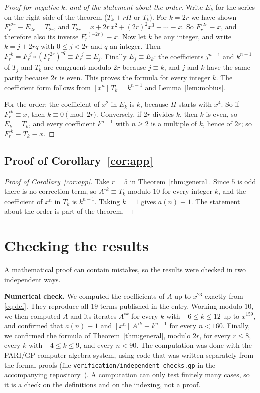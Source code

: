 \documentclass[11pt,a4paper]{article}
\theoremstyle{definition}
\theoremstyle{remark}
\newcommand{\coeff}[2]{[x^{#1}]\,#2}
\newcommand{\para}[1]{\par\medskip\noindent\textbf{#1}\enspace}
\begin{document}
\begin{proof}[Proof for negative $k$, and of the statement about the order]
Write $E_k$ for the series on the right side of the theorem ($T_k+rH$ or $T_k$). For $k=2r$ we have shown
$F_r^{\circ 2r}\equiv E_{2r}=T_{2r}$, and $T_{2r}=x+2r\,x^2+(2r)^2x^3+\cdots\equiv x$. So $F_r^{\circ2r}\equiv x$, and
therefore also its inverse $F_r^{\circ(-2r)}\equiv x$. Now let $k$ be any integer, and write $k=j+2rq$ with
$0\le j<2r$ and $q$ an integer. Then $F_r^{\circ k}=F_r^{\circ j}\circ(F_r^{\circ 2r})^{\circ q}\equiv F_r^{\circ j}\equiv E_j$.
Finally $E_j\equiv E_k$: the coefficients $j^{n-1}$ and $k^{n-1}$ of $T_j$ and $T_k$ are congruent modulo $2r$
because $j\equiv k$, and $j$ and $k$ have the same parity because $2r$ is even. This proves the formula for every
integer $k$. The coefficient form follows from $\coeff{n}{T_k}=k^{n-1}$ and Lemma~\ref{lem:mobius}.

For the order: the coefficient of $x^2$ in $E_k$ is $k$, because $H$ starts with $x^4$. So if $F_r^{\circ k}\equiv x$,
then $k\equiv0\pmod{2r}$. Conversely, if $2r$ divides $k$, then $k$ is even, so $E_k=T_k$, and every coefficient
$k^{n-1}$ with $n\ge2$ is a multiple of $k$, hence of $2r$; so $F_r^{\circ k}\equiv T_k\equiv x$.
\end{proof}

\subsection{Proof of Corollary~\ref{cor:app}}

\begin{proof}[Proof of Corollary~\ref{cor:app}]
Take $r=5$ in Theorem~\ref{thm:general}. Since $5$ is odd there is no correction term, so $A^{\circ k}\equiv T_k$
modulo $10$ for every integer $k$, and the coefficient of $x^n$ in $T_k$ is $k^{n-1}$. Taking $k=1$ gives
$a(n)\equiv1$. The statement about the order is part of the theorem.
\end{proof}

\section{Checking the results}\label{sec:checks}

A mathematical proof can contain mistakes, so the results were checked in two independent ways.

\para{Numerical check.}
We computed the coefficients of $A$ up to $x^{23}$ exactly from \eqref{eq:def}. They reproduce all
$19$ terms published in the entry. Working modulo $10$, we then computed $A$ and its iterates $A^{\circ k}$ for every
$k$ with $-6\le k\le12$ up to $x^{159}$, and confirmed that $a(n)\equiv1$ and $\coeff{n}{A^{\circ k}}\equiv k^{n-1}$
for every $n<160$. Finally, we confirmed the formula of Theorem~\ref{thm:general}, modulo $2r$, for every $r\le8$, every
$k$ with $-4\le k\le9$, and every $n<90$.
The computation was done with the PARI/GP computer algebra system, using code that was written separately from the
formal proofs (file \texttt{verification/independent\_checks.gp} in the accompanying repository~\cite{repo}).
A computation can only test finitely many cases, so it is a check on the definitions and on the indexing, not a proof.
\end{document}
